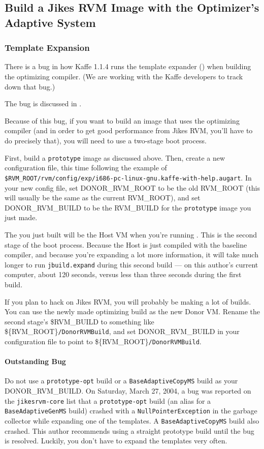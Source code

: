 \subsection{Build a Jikes RVM Image with the Optimizer's Adaptive System}
\subsubsection{Template Expansion}
  There is a bug in how Kaffe 1.1.4 runs the template expander (\gft)
  when building the \jrvm{} optimizing compiler.  (We are working with
  the Kaffe developers to track down that bug.)

  The bug is discussed in 
  .


Because of this bug, if you want to build an image that uses the
optimizing compiler (and in order to get good performance from Jikes
RVM, you'll have to do precisely that), you will need to use a
two-stage boot process.

First, build a {\tt prototype} image as discussed above.  Then, create
a new configuration file, this time following the example of {\tt
\$RVM\_\-ROOT/rvm/config/exp/i686-pc-linux-gnu.kaffe-with-help.augart}.    
In your new config file, set {DONOR\_RVM\_ROOT} to be the old RVM\_ROOT
(this will usually be the same as the current RVM\_ROOT), and set
DONOR\_RVM\_BUILD to be the RVM\_BUILD for the \texttt{prototype}
image you just made.

The \jrvm{} you just built will be the Host VM when you're running
\gft{}.  This is the second stage of the boot process.  Because the
Host \jrvm{} is just compiled with the baseline compiler, and because
you're expanding a lot more information, it will take much longer to
run \texttt{jbuild.expand} during this second build --- on this
author's current computer, about 120 seconds, versus less than three
seconds during the first build.

If you plan to hack on Jikes RVM, you will probably be making a lot of
builds.  You can use the newly made optimizing build as the new Donor VM.
Rename the second stage's \${RVM_BUILD} to something like
\$\{RVM_ROOT\}\texttt{/DonorRVMBuild}, and set 
DONOR\_RVM\_BUILD in your configuration file to point to
\$\{RVM_ROOT\}\texttt{/DonorRVMBuild}.  

\paragraph{Outstanding Bug} Do not use a {\tt prototype-opt} build or
a \texttt{BaseAdaptiveCopyMS} build as
your DONOR\_RVM\_BUILD.  On Saturday, March 27, 2004, a bug
was reported on the \texttt{jikesrvm-core} list that a
\texttt{prototype-opt} build (an alias for a
\texttt{BaseAdaptiveGenMS} build) crashed with a
\texttt{NullPointerException} in the garbage collector while expanding
one of the templates.  A \texttt{BaseAdaptiveCopyMS} build also
crashed.  This author recommends using a straight prototype build
until the bug is resolved.  Luckily, you don't have to expand the
templates very often.


